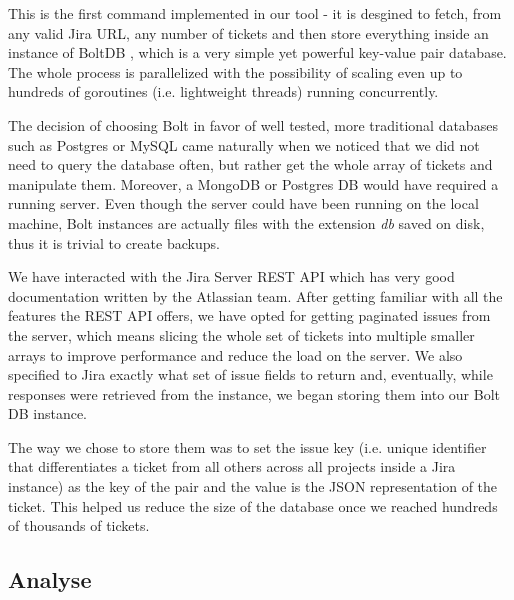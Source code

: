 \documentclass{mpaper}
\begin{document}
This is the first command implemented in our tool - it is desgined to fetch, from any valid Jira URL, any number of tickets 
and then store everything inside an instance of BoltDB \cite{bolt}, which is a very simple yet powerful key-value pair 
database. The whole process is parallelized with the possibility of scaling even up to hundreds of goroutines
(i.e. lightweight threads) running concurrently. 

The decision of choosing Bolt in favor of well tested, more traditional databases such as Postgres or MySQL came naturally when 
we noticed that we did not need to query the database often, but rather get the whole array of tickets and manipulate them. Moreover, 
a MongoDB or Postgres DB would have required a running server. Even though the server could have been running on the local machine, 
Bolt instances are actually files with the extension \emph{db} saved on disk, thus it is trivial to create backups.

We have interacted with the Jira Server REST API which has very good documentation written by the Atlassian team. After getting
familiar with all the features the REST API offers, we have opted for getting paginated issues from the server, which means 
slicing the whole set of tickets into multiple smaller arrays to improve performance and reduce the load on the server. We also
specified to Jira exactly what set of issue fields to return and, eventually, while responses were retrieved from the instance,
we began storing them into our Bolt DB instance. 

The way we chose to store them was to set the issue key (i.e. unique identifier that differentiates a ticket from all others across all 
projects inside a Jira instance) as the key of the pair and the value is the JSON representation of the ticket. This helped us reduce 
the size of the database once we reached hundreds of thousands of tickets.

\subsection{Analyse}
\end{document}
